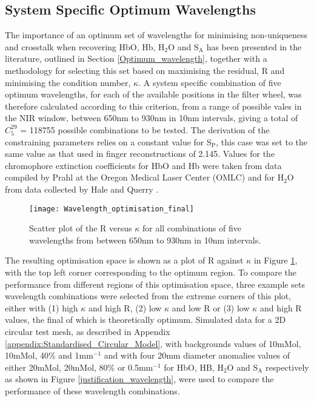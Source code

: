 \documentclass[twoside]{bhamthesis}
\theoremstyle{definition}
\begin{document}
\subsection{System Specific Optimum Wavelengths}
\label{System Specific Optimum Wavelength}

The importance of an optimum set of wavelengths for minimising non-uniqueness and crosstalk when recovering HbO, Hb, $\mathrm{H_2O}$ and $\mathrm{S_A}$ has been presented in the literature, outlined in Section \ref{Optimum_wavelength}, together with a methodology for selecting this set based on maximising the residual, R and minimising the condition number, $\kappa$. A system specific combination of five optimum wavelengths, for each of the available positions in the filter wheel, was therefore calculated according to this criterion, from a range of possible vales in the NIR window, between 650nm to 930nm in 10nm intervals, giving a total of $C_5^{29}$ = 118755 possible combinations to be tested. The derivation of the constraining parameters relies on a constant value for $\mathrm{S_P}$, this case was set to the same value as that used in finger reconstructions of 2.145. Values for the chromophore extinction coefficients for HbO and Hb were taken from data compiled by Prahl at the Oregon Medical Laser Center (OMLC) \cite{prahl1999tabulated} and for $\mathrm{H_2O}$ from data collected by Hale and Querry \cite{hale1973optical}. 

\begin{figure}[!ht]
\centering
  \texttt{[image: Wavelength\_optimisation\_final]}
  \caption{Scatter plot of the R versus $\kappa$ for all combinations of five wavelengths from between 650nm to 930nm in 10nm intervals.}
  \label{Wavelength_scatter}
\end{figure}

The resulting optimisation space is shown as a plot of R against $\kappa$ in Figure \ref{Wavelength_scatter}, with the top left corner corresponding to the optimum region. To compare the performance from different regions of this optimisation space, three example sets wavelength combinations were selected from the extreme corners of this plot, either with (1) high $\kappa$ and high R, (2) low $\kappa$ and low R or (3) low $\kappa$ and high R values, the final of which is theoretically optimum. Simulated data for a 2D circular test mesh, as described in Appendix \ref{appendix:Standardised_Circular_Model},  with backgrounds values of 10mMol, 10mMol, 40\% and 1mm$^{-1}$ and with four 20mm diameter anomalies values of either 20mMol, 20mMol, 80\% or 0.5mm$^{-1}$ for HbO, HB, $\mathrm{H_2O}$ and $\mathrm{S_A}$ respectively as shown in Figure \ref{justification_wavelength}, were used to compare the performance of these wavelength combinations.
\end{document}
